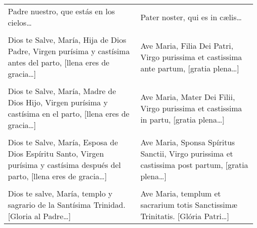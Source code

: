 \documentclass[./rosary.tex]{subfiles}
\begin{document}
\label{final-prayer}

\begin{longtable} { p{} p{} }
    Padre nuestro, que estás en los cielos{\ldots}
        &
    Pater noster, qui es in cælis{\ldots}\\\\

    Dios te Salve, María, Hija de Dios Padre, Virgen purísima y castísima antes del parto, [llena eres de gracia{\ldots}]
        &
    Ave Maria, Filia Dei Patri, Virgo purissima et castissima ante partum, [gratia plena{\ldots}]\\\\

    Dios te Salve, María, Madre de Dios Hijo, Virgen purísima y castísima en el parto, [llena eres de gracia{\ldots}]
        &
    Ave Maria, Mater Dei Filii, Virgo purissima et castissima in partu, [gratia plena{\ldots}]\\\\

    Dios te Salve, María, Esposa de Dios Espíritu Santo, Virgen purísima y castísima después del parto, [llena eres de gracia{\ldots}]
        &
    Ave Maria, Sponsa Spíritus Sanctii, Virgo purissima et castissima post partum, [gratia plena{\ldots}]\\\\      
    
    Dios te salve, María, templo y sagrario de la Santísima Trinidad. [Gloria al Padre{\ldots}]
        &
    Ave Maria, templum et sacrarium totis Sanctissimæ Trinitatis. [Glória Patri{\ldots}]
\end{longtable}
\end{document}
